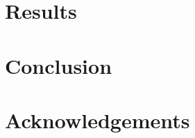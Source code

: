\documentclass[letterpaper,twocolumn,10pt]{article}
\begin{document}
\section{Results}


\section{Conclusion}


\section{Acknowledgements}





\end{document}
